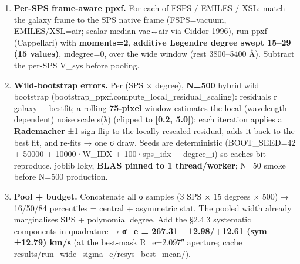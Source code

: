 \documentclass[
]{article}
\providecommand{\tightlist}{%
  \setlength{\itemsep}{0pt}\setlength{\parskip}{0pt}}
\newcommand{\BreakablePath}[1]{{\ttfamily\sloppy #1}}
\begin{document}
\begin{enumerate}
  \begin{itemize}
  \tightlist
  \item
    \textbf{Outlier rejection / sigma-clipping decision:} ppxf's in-fit
    \textbf{\BreakablePath{clean=False}} --- \BreakablePath{clean=True}
    rejects 0 pixels here (the KCWI noise array is overestimated vs the
    actual residual scatter), so it is inert. Instead, cosmic-ray/bad
    pixels are flagged by a \textbf{3σ local-MAD clip} (rolling 75-pixel
    window, \textbar residual\textbar/local-MAD \textgreater{} 3σ) on
    the canonical residuals → 52 CR-like spikes, curated into the 26 CR
    entries of
    \BreakablePath{BAD\_\discretionary{}{}{}PIXELS\_\discretionary{}{}{}REST};
    the 9 M10 sky bands were flagged separately at \textgreater2.5×
    median sky-noise. \textbf{Caveats (carried as a stated sensitivity,
    not a budget term):} the 3σ threshold is not strongly motivated vs
    alternatives, and cleaning shifts σ\_e by only +1.4 km/s (below stat
    1σ); the same pixels replicate the shift on the OLD cube (M6) → real
    CR residuals.
  \end{itemize}
\item
  \textbf{Per-SPS frame-aware ppxf.} For each of FSPS / EMILES / XSL:
  match the galaxy frame to the SPS native frame (FSPS=vacuum,
  EMILES/XSL=air; scalar-median vac↔air via Ciddor 1996), run
  \BreakablePath{ppxf} (Cappellari) with \textbf{moments=2},
  \textbf{additive Legendre \BreakablePath{degree} swept 15--29 (15
  values)}, \BreakablePath{mdegree=0}, over the wide window (rest
  3800--5400 Å). Subtract the per-SPS V\_sys before pooling.
\item
  \textbf{Wild-bootstrap errors.} Per (SPS × degree), \textbf{N=500}
  hybrid wild bootstrap
  (\BreakablePath{bootstrap\_\discretionary{}{}{}ppxf.\discretionary{}{}{}compute\_\discretionary{}{}{}local\_\discretionary{}{}{}residual\_\discretionary{}{}{}scaling}):
  residuals r = galaxy − bestfit; a rolling \textbf{75-pixel} window
  estimates the local (wavelength-dependent) noise scale s(λ) (clipped
  to \textbf{{[}0.2, 5.0{]}}); each iteration applies a
  \textbf{Rademacher} ±1 sign-flip to the locally-rescaled residual,
  adds it back to the best fit, and re-fits → one σ draw. Seeds are
  deterministic
  (\BreakablePath{BOOT\_\discretionary{}{}{}SEED=42 + 50000 + 10000·W\_\discretionary{}{}{}IDX + 100·sps\_\discretionary{}{}{}idx + degree\_\discretionary{}{}{}i})
  so caches bit-reproduce. joblib \BreakablePath{loky}, \textbf{BLAS
  pinned to 1 thread/worker}; N=50 smoke before N=500 production.
\item
  \textbf{Pool + budget.} Concatenate all σ samples (3 SPS × 15 degrees
  × 500) → 16/50/84 percentiles = central + asymmetric stat. The pooled
  width already marginalises SPS + polynomial degree. Add the §2.4.3
  systematic components in quadrature → \textbf{σ\_e = 267.31
  −12.98/+12.61 (sym ±12.79) km/s} (at the best-mask R\_e=2.097″
  aperture; cache
  \BreakablePath{results/\discretionary{}{}{}run\_\discretionary{}{}{}wide\_\discretionary{}{}{}sigma\_\discretionary{}{}{}e/\discretionary{}{}{}resys\_\discretionary{}{}{}best\_\discretionary{}{}{}mean/\discretionary{}{}{}}).
\end{enumerate}
\end{document}
